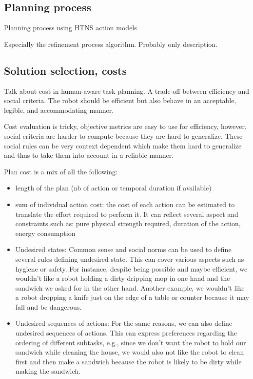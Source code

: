 \subsection{Planning process}
Planning process using HTNS action models

Especially the refinement process algorithm. Probably only description.

\subsection{Solution selection, costs}

Talk about cost in human-aware task planning. A trade-off between efficiency and social criteria. The robot should be efficient but also behave in an acceptable, legible, and accommodating manner.  


Cost evaluation is tricky, objective metrics are easy to use for efficiency, however, social criteria are harder to compute because they are hard to generalize. These social rules can be very context dependent which make them hard to generalize and thus to take them into account in a reliable manner.

Plan cost is a mix of all the following:

\begin{itemize}
    \item length of the plan (nb of action or temporal duration if available)
    \item sum of individual action cost: the cost of each action can be estimated to translate the effort required to perform it. It can reflect several aspect and constraints such as: pure physical strength required, duration of the action, energy consumption
    \item Undesired states: Common sense and social norms can be used to define several rules defining undesired state. This can cover various aspects such as hygiene or safety. For instance, despite being possible and maybe efficient, we wouldn't like a robot holding a dirty dripping mop in one hand and the sandwich we asked for in the other hand. Another example, we wouldn't like a robot dropping a knife just on the edge of a table or counter because it may fall and be dangerous. 
    \item Undesired sequences of actions: For the same reasons, we can also define undesired sequences of actions. This can express preferences regarding the ordering of different subtasks, e.g., since we don't want the robot to hold our sandwich while cleaning the house, we would also not like the robot to clean first and then make a sandwich because the robot is likely to be dirty while making the sandwich.  
\end{itemize}

